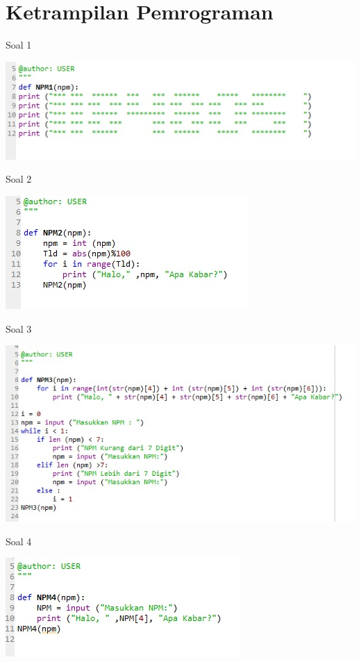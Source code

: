 \documentclass[a4paper,12pt]{report}
\begin{document}
\section{Ketrampilan Pemrograman}
\item Soal 1
    \begin{center}
    \includegraphics[width=11cm\textwidth]{Ketrampilan/1.jpg}
    \end{center}
\item Soal 2
    \begin{center}
    \includegraphics[width=11cm\textwidth]{Ketrampilan/2.jpg}
    \end{center}
\item Soal 3
    \begin{center}
    \includegraphics[width=11cm\textwidth]{Ketrampilan/3.jpg}
    \end{center}
\item Soal 4
    \begin{center}
    \includegraphics[width=11cm\textwidth]{Ketrampilan/4.jpg}
    \end{center}
\end{document}
